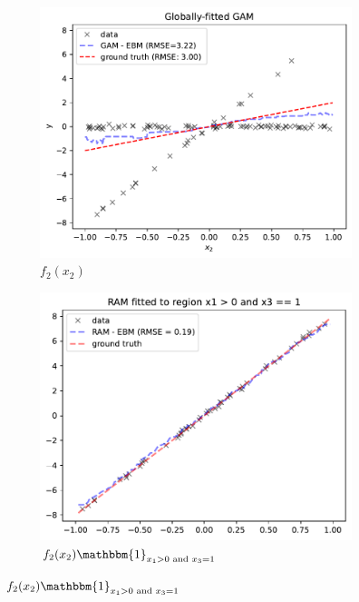 \documentclass[runningheads]{llncs}
\newcommand{\when}[1]{\mathbbm{1}_{#1}}
\begin{document}
\begin{figure}[htbp]
    \centering
    \begin{subfigure}{0.32\textwidth}
        \centering
        \includegraphics[width=\textwidth]{figures/global_GAM}
        \caption{\(f_2(x_2)\)}
        \label{subfig:global_gam}
    \end{subfigure}
    \begin{subfigure}{0.32\textwidth}
        \centering
        \includegraphics[width=\textwidth]{figures/regional_gam_subreg_1}
        \caption{\(f_2(x_2) \when{x_1 > 0 \text{ and } x_3 = 1}\)}
        \label{subfig:regional_gam_1}

\end{subfigure}
\end{figure}
\end{document}
